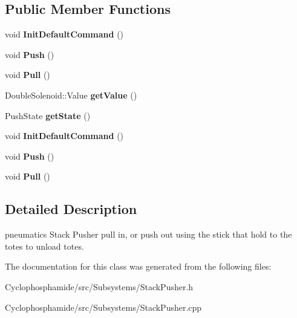 \subsection*{Public Member Functions}
\begin{DoxyCompactItemize}
\item 
\hypertarget{class_stack_pusher_ab417d768ab7a62abb345f90f430db33b}{}void {\bfseries Init\+Default\+Command} ()\label{class_stack_pusher_ab417d768ab7a62abb345f90f430db33b}

\item 
\hypertarget{class_stack_pusher_a4483faf60977aee62e81fec2633cd235}{}void {\bfseries Push} ()\label{class_stack_pusher_a4483faf60977aee62e81fec2633cd235}

\item 
\hypertarget{class_stack_pusher_aaf80b44d7b297119070fc5ebd200f66e}{}void {\bfseries Pull} ()\label{class_stack_pusher_aaf80b44d7b297119070fc5ebd200f66e}

\item 
\hypertarget{class_stack_pusher_a282863dc7c3e1cc8d22f5d2fa7e13a05}{}Double\+Solenoid\+::\+Value {\bfseries get\+Value} ()\label{class_stack_pusher_a282863dc7c3e1cc8d22f5d2fa7e13a05}

\item 
\hypertarget{class_stack_pusher_a4bd59d38a910b52c9be86521f57fd3ec}{}Push\+State {\bfseries get\+State} ()\label{class_stack_pusher_a4bd59d38a910b52c9be86521f57fd3ec}

\item 
\hypertarget{class_stack_pusher_ab417d768ab7a62abb345f90f430db33b}{}void {\bfseries Init\+Default\+Command} ()\label{class_stack_pusher_ab417d768ab7a62abb345f90f430db33b}

\item 
\hypertarget{class_stack_pusher_a4483faf60977aee62e81fec2633cd235}{}void {\bfseries Push} ()\label{class_stack_pusher_a4483faf60977aee62e81fec2633cd235}

\item 
\hypertarget{class_stack_pusher_aaf80b44d7b297119070fc5ebd200f66e}{}void {\bfseries Pull} ()\label{class_stack_pusher_aaf80b44d7b297119070fc5ebd200f66e}

\end{DoxyCompactItemize}


\subsection{Detailed Description}
pneumatics Stack Pusher pull in, or push out using the stick that hold to the totes to unload totes. 

The documentation for this class was generated from the following files\+:\begin{DoxyCompactItemize}
\item 
Cyclophosphamide/src/\+Subsystems/Stack\+Pusher.\+h\item 
Cyclophosphamide/src/\+Subsystems/Stack\+Pusher.\+cpp\end{DoxyCompactItemize}
